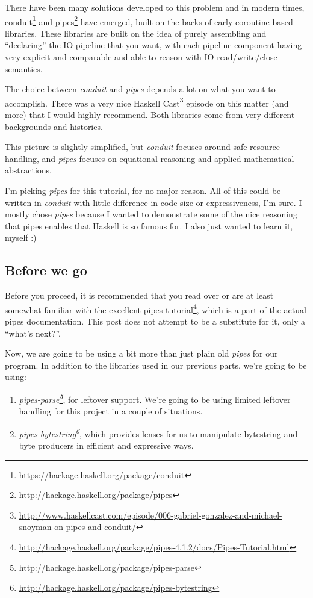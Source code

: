 \documentclass[]{article}
\renewcommand{\href}[2]{#2\footnote{\url{#1}}}
\begin{document}
There have been many solutions developed to this problem and in modern
times, \href{https://hackage.haskell.org/package/conduit}{conduit} and
\href{http://hackage.haskell.org/package/pipes}{pipes} have emerged,
built on the backs of early coroutine-based libraries. These libraries
are built on the idea of purely assembling and ``declaring'' the IO
pipeline that you want, with each pipeline component having very
explicit and comparable and able-to-reason-with IO read/write/close
semantics.

The choice between \emph{conduit} and \emph{pipes} depends a lot on what
you want to accomplish. There was a very nice
\href{http://www.haskellcast.com/episode/006-gabriel-gonzalez-and-michael-snoyman-on-pipes-and-conduit/}{Haskell
Cast} episode on this matter (and more) that I would highly recommend.
Both libraries come from very different backgrounds and histories.

This picture is slightly simplified, but \emph{conduit} focuses around
safe resource handling, and \emph{pipes} focuses on equational reasoning
and applied mathematical abstractions.

I'm picking \emph{pipes} for this tutorial, for no major reason. All of
this could be written in \emph{conduit} with little difference in code
size or expressiveness, I'm sure. I mostly chose \emph{pipes} because I
wanted to demonstrate some of the nice reasoning that pipes enables that
Haskell is so famous for. I also just wanted to learn it, myself :)

\subsection{Before we go}\label{before-we-go}

Before you proceed, it is recommended that you read over or are at least
somewhat familiar with the excellent
\href{http://hackage.haskell.org/package/pipes-4.1.2/docs/Pipes-Tutorial.html}{pipes
tutorial}, which is a part of the actual pipes documentation. This post
does not attempt to be a substitute for it, only a ``what's next?''.

Now, we are going to be using a bit more than just plain old
\emph{pipes} for our program. In addition to the libraries used in our
previous parts, we're going to be using:

\begin{enumerate}
\def\labelenumi{\arabic{enumi}.}
\tightlist
\item
  \emph{\href{http://hackage.haskell.org/package/pipes-parse}{pipes-parse}},
  for leftover support. We're going to be using limited leftover
  handling for this project in a couple of situations.
\item
  \emph{\href{http://hackage.haskell.org/package/pipes-bytestring}{pipes-bytestring}},
  which provides lenses for us to manipulate bytestring and byte
  producers in efficient and expressive ways.
\end{enumerate}
\end{document}
